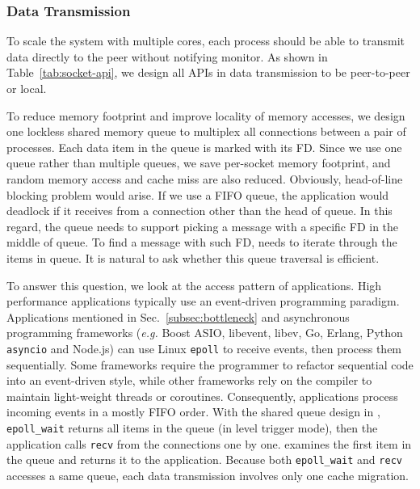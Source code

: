 

\subsubsection{Data Transmission}
\label{subsubsec:data_trans}

To scale the system with multiple cores, each process should be able to transmit data directly to the peer without notifying monitor. As shown in Table~\ref{tab:socket-api}, we design all APIs in data transmission to be peer-to-peer or local.

To reduce memory footprint and improve locality of memory accesses, we design one lockless shared memory queue to multiplex all connections between a pair of processes. Each data item in the queue is marked with its FD. Since we use one queue rather than multiple queues, we save per-socket memory footprint, and random memory access and cache miss are also reduced. Obviously, head-of-line blocking problem would arise. If we use a FIFO queue, the application would deadlock if it receives from a connection other than the head of queue. In this regard, the queue needs to support picking a message with a specific FD in the middle of queue. To find a message with such FD, \libipc{} needs to iterate through the items in queue. It is natural to ask whether this queue traversal is efficient.

To answer this question, we look at the access pattern of applications. High performance applications typically use an event-driven programming paradigm. Applications mentioned in Sec.~\ref{subsec:bottleneck} and asynchronous programming frameworks (\textit{e.g.} Boost ASIO, libevent, libev, Go, Erlang, Python \texttt{asyncio} and Node.js) can use Linux \texttt{epoll} to receive events, then process them sequentially. Some frameworks require the programmer to refactor sequential code into an event-driven style, while other frameworks rely on the compiler to maintain light-weight threads or coroutines. Consequently, applications process incoming events in a mostly FIFO order. With the shared queue design in \libipc{}, \texttt{epoll\_wait} returns all items in the queue (in level trigger mode), then the application calls \texttt{recv} from the connections one by one. \libipc{} examines the first item in the queue and returns it to the application. Because both \texttt{epoll\_wait} and \texttt{recv} accesses a same queue, each data transmission involves only one cache migration.

